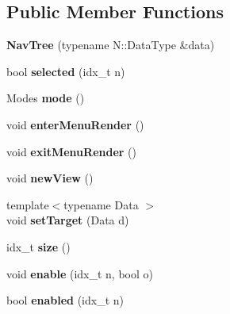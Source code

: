 \subsection*{Public Member Functions}
\begin{DoxyCompactItemize}
\item 
\mbox{\label{classNavTree_a2a48108c76faeb32b167fef420807cd1}} 
{\bfseries Nav\+Tree} (typename N\+::\+Data\+Type \&data)
\item 
\mbox{\label{classNavTree_a44d2ba788071454919fd6adf367f14cf}} 
bool {\bfseries selected} (idx\+\_\+t n)
\item 
\mbox{\label{classNavTree_a7a52f5828647ac8a728b6e0e99af69db}} 
Modes {\bfseries mode} ()
\item 
\mbox{\label{classNavTree_a6526a911469b2fe3ddae9014c29d1b7d}} 
void {\bfseries enter\+Menu\+Render} ()
\item 
\mbox{\label{classNavTree_a3cec525c27483a885de1b0fea0294d37}} 
void {\bfseries exit\+Menu\+Render} ()
\item 
\mbox{\label{classNavTree_a76175fb2ee608101070059cbcbf64cae}} 
void {\bfseries new\+View} ()
\item 
\mbox{\label{classNavTree_a30054c028d86d65e65fa0c987fb15bd9}} 
{\footnotesize template$<$typename Data $>$ }\\void {\bfseries set\+Target} (Data d)
\item 
\mbox{\label{classNavTree_a1cd4f55c3bb50895c8830632f04117d1}} 
idx\+\_\+t {\bfseries size} ()
\item 
\mbox{\label{classNavTree_a7e4c8184eae898e217f6a3a2e3fbf792}} 
void {\bfseries enable} (idx\+\_\+t n, bool o)
\item 
\mbox{\label{classNavTree_ab97c57437a90b83fe40a6b4de88d7642}} 
bool {\bfseries enabled} (idx\+\_\+t n)
\item 
\mbox{\label{classNavTree_aac8b96a359ec9f8f0952e74b67ef48fd}} 

\end{DoxyCompactItemize}
